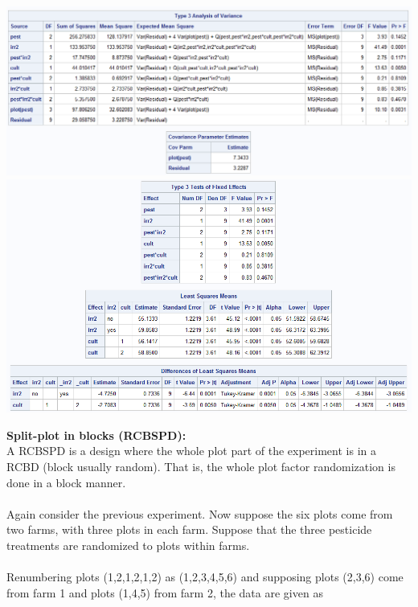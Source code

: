 \begin{center}
\includegraphics[scale=0.59]{CornSp4}\\
\includegraphics[scale=0.7]{CornSp5}\\
\end{center}

\newpage

\textbf{Split-plot in blocks (RCBSPD):}\\
A RCBSPD is a design where the whole plot part of the experiment is in a RCBD (block usually random).  That is, the whole plot factor randomization is done in a block manner.\\~\\

Again consider the previous experiment.  Now suppose the six plots come from two farms, with three plots in each farm.  Suppose
that the three pesticide treatments are randomized to plots within farms.  \\~\\
Renumbering plots (1,2,1,2,1,2) as (1,2,3,4,5,6) and supposing plots (2,3,6) come from farm 1 and plots (1,4,5) from farm 2, the data are given as

